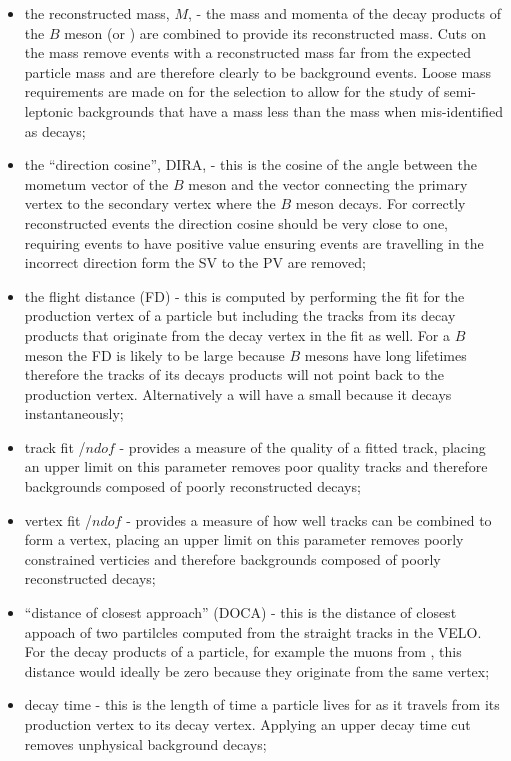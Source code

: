 \begin{itemize}
\item the reconstructed mass, $M$, - the mass and momenta of the decay products of the $B$ meson (or \jpsi) are combined to provide its reconstructed mass. Cuts on the mass remove events with a reconstructed mass far from the expected particle mass and are therefore clearly to be background events. Loose mass requirements are made on for the \bsmumu selection to allow for the study of semi-leptonic backgrounds that have a mass less than the \bs mass when mis-identified as \bsmumu decays;
\item the ``direction cosine'', DIRA, - this is the cosine of the angle between the mometum vector of the $B$ meson and the vector connecting the primary vertex to the secondary vertex where the $B$ meson decays. For correctly reconstructed events the direction cosine should be very close to one, requiring events to have positive value ensuring events are travelling in the incorrect direction form the SV to the PV are removed;
\item the flight distance (FD) \chisqd - this is computed by performing the fit for the production vertex of a particle but including the tracks from its decay products that originate from the decay vertex in the fit as well. For a $B$ meson the FD \chisqd is likely to be large because $B$ mesons have long lifetimes therefore the tracks of its decays products will not point back to the production vertex. Alternatively a \jpsi will have a small \chisqd because it decays instantaneously;
\item track fit \chisqd/$ndof$ - provides a measure of the quality of a fitted track, placing an upper limit on this parameter removes poor quality tracks and therefore backgrounds composed of poorly reconstructed decays;
\item vertex fit \chisqd/$ndof$ - provides a measure of how well tracks can be combined to form a vertex, placing an upper limit on this parameter removes poorly constrained verticies and therefore backgrounds composed of poorly reconstructed decays;
\item ``distance of closest approach'' (DOCA) - this is the distance of closest appoach of two partilcles computed from the straight tracks in the VELO. For the decay products of a particle, for example the muons from \bsmumu, this distance would ideally be zero because they originate from the same vertex;
\item decay time \lt - this is the length of time a particle lives for as it travels from its production vertex to its decay vertex. Applying an upper decay time cut removes unphysical background decays;

\end{itemize}
